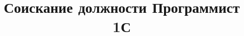 \documentclass[12pt,a4paper,sans]{moderncv}        %
\title{Соискание должности Программист 1С}%
\begin{document}
\makecvtitle





%
%
%
%
%
%
\end{document}
